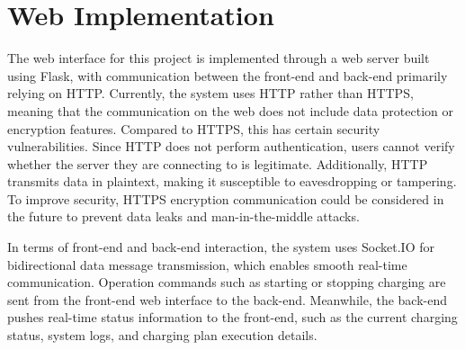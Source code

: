 \documentclass[
	english,
	ruledheaders=section,%
	class=report,%
	thesis={type=Report},%
	accentcolor=9c,%
	custommargins=true,%
	marginpar=false,%
	parskip=half-,%
	fontsize=11pt,%
	logofile={img/tuda_logo.pdf}, %
]{tudapub}
\begin{document}

\section{Web Implementation}
The web interface for this project is implemented through a web server built using Flask, with communication between the front-end and back-end primarily relying on HTTP. Currently, the system uses HTTP rather than HTTPS, meaning that the communication on the web does not include data protection or encryption features. Compared to HTTPS, this has certain security vulnerabilities. Since HTTP does not perform authentication, users cannot verify whether the server they are connecting to is legitimate. Additionally, HTTP transmits data in plaintext, making it susceptible to eavesdropping or tampering. To improve security, HTTPS encryption communication could be considered in the future to prevent data leaks and man-in-the-middle attacks.

In terms of front-end and back-end interaction, the system uses Socket.IO for bidirectional data message transmission, which enables smooth real-time communication. Operation commands such as starting or stopping charging are sent from the front-end web interface to the back-end. Meanwhile, the back-end pushes real-time status information to the front-end, such as the current charging status, system logs, and charging plan execution details.
\end{document}

